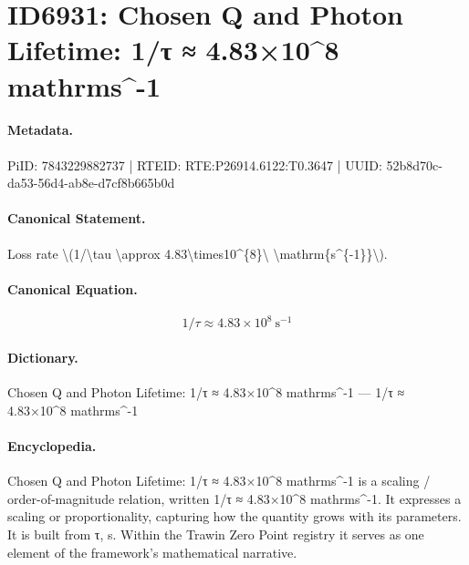 \section*{ID6931: Chosen Q and Photon Lifetime: 1/τ ≈ 4.83×10\textasciicircum{}8 mathrms\textasciicircum{}-1}
\paragraph{Metadata.}
PiID: 7843229882737 | RTEID: RTE:P26914.6122:T0.3647 | UUID: 52b8d70c-da53-56d4-ab8e-d7cf8b665b0d

\paragraph{Canonical Statement.}
Loss rate \textbackslash{}(1/\textbackslash{}tau \textbackslash{}approx 4.83\textbackslash{}times10\textasciicircum{}\{8\}\textbackslash{} \textbackslash{}mathrm\{s\textasciicircum{}\{-1\}\}\textbackslash{}).

\paragraph{Canonical Equation.}
\[
1/\tau \approx 4.83\times10^{8}\ \mathrm{s^{-1}}
\]

\paragraph{Dictionary.}
Chosen Q and Photon Lifetime: 1/τ ≈ 4.83×10\textasciicircum{}8 mathrms\textasciicircum{}-1 — 1/τ ≈ 4.83×10\textasciicircum{}8 mathrms\textasciicircum{}-1

\paragraph{Encyclopedia.}
Chosen Q and Photon Lifetime: 1/τ ≈ 4.83×10\textasciicircum{}8 mathrms\textasciicircum{}-1 is a scaling / order-of-magnitude relation, written 1/τ ≈ 4.83×10\textasciicircum{}8 mathrms\textasciicircum{}-1. It expresses a scaling or proportionality, capturing how the quantity grows with its parameters. It is built from τ, s. Within the Trawin Zero Point registry it serves as one element of the framework's mathematical narrative.
